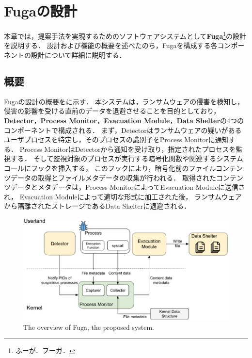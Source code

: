 \chapter{Fugaの設計}
\label{chap:design}
本章では，提案手法を実現するためのソフトウェアシステムとして\textbf{Fuga}\footnote{ふーが．フーガ．}の設計を説明する．
設計および機能の概要を述べたのち，Fugaを構成する各コンポーネントの設計について詳細に説明する．
\section{概要}
Fugaの設計の概要をに示す．
本システムは，ランサムウェアの侵害を検知し，侵害の影響を受ける直前のデータを退避させることを目的としており，
\textbf{Detector}，\textbf{Process Monitor}，\textbf{Evacuation Module}，\textbf{Data Shelter}の4つのコンポーネントで構成される．
まず，Detectorはランサムウェアの疑いがあるユーザプロセスを特定し，そのプロセスの識別子をProcess Monitorに通知する．
Process MonitorはDetectorから通知を受け取り，指定されたプロセスを監視する．
そして監視対象のプロセスが実行する暗号化関数や関連するシステムコールにフックを挿入する，
このフックにより，暗号化前のファイルコンテンツデータの取得とファイルメタデータの収集が行われる．
取得されたコンテンツデータとメタデータは，Process MonitorによってEvacuation Moduleに送信され，
Evacuation Moduleによって適切な形式に加工された後，
ランサムウェアから隔離されたストレージであるData Shelterに退避される．

\begin{figure}[t]
  \centering
  \includegraphics[width=\columnwidth]{doc/img/system_overview.eps}
  \caption{The overview of Fuga, the proposed system.}
  \label{fig:system-architecture}
\end{figure}

